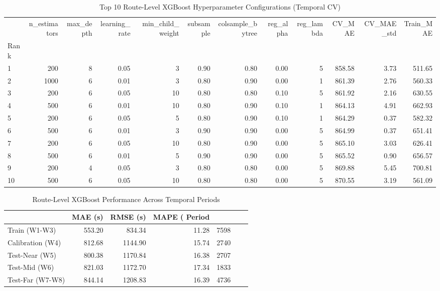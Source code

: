\begin{table}
\caption{Top 10 Route-Level XGBoost Hyperparameter Configurations (Temporal CV)}
\label{tab:top10_hyperparams}
\begin{tabular}{lrrrrrrrrrrr}
\toprule
 & n_estimators & max_depth & learning_rate & min_child_weight & subsample & colsample_bytree & reg_alpha & reg_lambda & CV_MAE & CV_MAE_std & Train_MAE \\
Rank &  &  &  &  &  &  &  &  &  &  &  \\
\midrule
1 & 200 & 8 & 0.05 & 3 & 0.90 & 0.80 & 0.00 & 5 & 858.58 & 3.73 & 511.65 \\
2 & 1000 & 6 & 0.01 & 3 & 0.80 & 0.90 & 0.00 & 1 & 861.39 & 2.76 & 560.33 \\
3 & 200 & 6 & 0.05 & 10 & 0.80 & 0.80 & 0.10 & 5 & 861.92 & 2.16 & 630.55 \\
4 & 500 & 6 & 0.01 & 10 & 0.80 & 0.90 & 0.10 & 1 & 864.13 & 4.91 & 662.93 \\
5 & 200 & 6 & 0.05 & 5 & 0.80 & 0.90 & 0.10 & 1 & 864.29 & 0.37 & 582.32 \\
6 & 500 & 6 & 0.01 & 3 & 0.90 & 0.90 & 0.00 & 5 & 864.99 & 0.37 & 651.41 \\
7 & 200 & 6 & 0.05 & 10 & 0.80 & 0.90 & 0.00 & 5 & 865.10 & 3.03 & 626.41 \\
8 & 500 & 6 & 0.01 & 5 & 0.90 & 0.90 & 0.00 & 5 & 865.52 & 0.90 & 656.57 \\
9 & 200 & 4 & 0.05 & 3 & 0.80 & 0.80 & 0.00 & 5 & 869.88 & 5.45 & 700.81 \\
10 & 500 & 6 & 0.05 & 10 & 0.80 & 0.80 & 0.00 & 5 & 870.55 & 3.19 & 561.09 \\
\bottomrule
\end{tabular}
\end{table}



\begin{table}
\caption{Route-Level XGBoost Performance Across Temporal Periods}
\label{tab:route_xgboost_performance}
\begin{tabular}{lrrrr}
\toprule
 & MAE (s) & RMSE (s) & MAPE (%
Period &  &  &  &  \\
\midrule
Train (W1-W3) & 553.20 & 834.34 & 11.28 & 7598 \\
Calibration (W4) & 812.68 & 1144.90 & 15.74 & 2740 \\
Test-Near (W5) & 800.38 & 1170.84 & 16.38 & 2707 \\
Test-Mid (W6) & 821.03 & 1172.70 & 17.34 & 1833 \\
Test-Far (W7-W8) & 844.14 & 1208.83 & 16.39 & 4736 \\
\bottomrule
\end{tabular}
\end{table}




